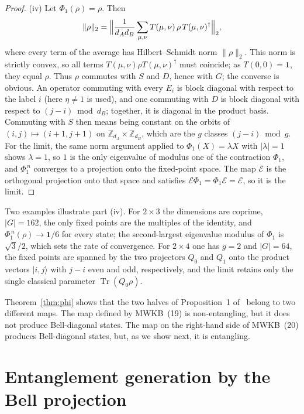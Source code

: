 \documentclass[11pt,a4paper]{article}
\theoremstyle{definition}
\theoremstyle{remark}
\newcommand{\ket}[1]{\lvert #1\rangle}
\newcommand{\dA}{d_A}
\newcommand{\dB}{d_B}
\newcommand{\cE}{\mathcal{E}}
\newcommand{\tr}{\operatorname{Tr}}
\newcommand{\id}{\mathbf{1}}
\begin{document}
\begin{proof}
(iv) Let $\Phi_1(\rho)=\rho$. Then
\begin{equation*}
\|\rho\|_2=\Bigl\|\frac{1}{\dA\dB}\sum_{\mu,\nu}T(\mu,\nu)\,\rho\,T(\mu,\nu)^{\dagger}\Bigr\|_2 ,
\end{equation*}
where every term of the average has Hilbert--Schmidt norm $\|\rho\|_2$. This norm is
strictly convex, so all terms $T(\mu,\nu)\rho T(\mu,\nu)^{\dagger}$ must coincide; as
$T(0,0)=\id$, they equal $\rho$.
Thus $\rho$ commutes with $S$ and $D$, hence with $G$; the converse is obvious. An operator
commuting with every $E_i$ is block diagonal with respect to the label $i$ (here
$\eta\neq1$ is used), and one commuting with $D$ is block diagonal with respect to
$(j-i)\bmod\dB$; together, it is diagonal in the product basis. Commuting with $S$ then
means being constant on the orbits of $(i,j)\mapsto(i+1,j+1)$ on
$\mathbb{Z}_{\dA}\times\mathbb{Z}_{\dB}$, which are the $g$ classes $(j-i)\bmod g$. For the
limit, the same norm argument applied to $\Phi_1(X)=\lambda X$ with $|\lambda|=1$ shows
$\lambda=1$, so $1$ is the only eigenvalue of modulus one of the contraction $\Phi_1$, and
$\Phi_1^{\,n}$ converges to a projection onto the fixed-point space. The map $\cE$ is the
orthogonal projection onto that space and satisfies $\cE\Phi_1=\Phi_1\cE=\cE$, so it is the
limit.
\end{proof}

Two examples illustrate part (iv). For $2\times3$ the dimensions are coprime, $|G|=162$,
the only fixed points are the multiples of the identity, and
$\Phi_1^{\,n}(\rho)\to\id/6$ for every state; the second-largest eigenvalue modulus of
$\Phi_1$ is $\sqrt3/2$, which sets the rate of convergence. For $2\times4$ one has $g=2$
and $|G|=64$, the fixed points are spanned by the two projectors $Q_0$ and $Q_1$ onto the
product vectors $\ket{i,j}$ with $j-i$ even and odd, respectively, and the limit retains
only the single classical parameter $\tr(Q_0\rho)$.

Theorem~\ref{thm:phi} shows that the two halves of Proposition~1 of~\cite{MWKB24} belong to
two different maps. The map defined by MWKB~(19) is non-entangling, but it does not
produce Bell-diagonal states. The map on the right-hand side of MWKB~(20) produces
Bell-diagonal states, but, as we show next, it is entangling.

\section{Entanglement generation by the Bell projection}
\end{document}

